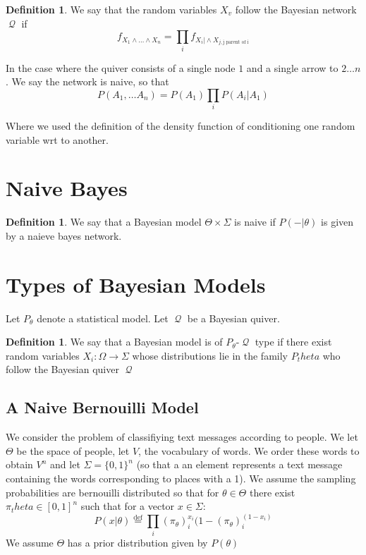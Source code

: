 \documentclass{book}
\theoremstyle{plain}
\theoremstyle{definition}
\newtheorem{definition}[corollary]{Definition}
\newcommand{\define}{\stackrel{\operatorname{def}}{=}}
\newcommand{\mor}{\longrightarrow}
\DeclareMathOperator{\Qvr}{\mathcal{Q}}
\begin{document}
\begin{definition}
We say that the random variables $X_v$ follow the Bayesian network $\Qvr$ if
\[
f_{X_1\wedge \ldots \wedge X_n}=\prod_i f_{X_i \vert \wedge X_{j, \textrm{j parent of i}}}\]
\end{definition}
In the case where the quiver consists of a single node $1$ and a single arrow to $2\ldots n$. We say the network is naive, so that
\[
P(A_1,\ldots A_n)=P(A_1)\prod_i P(A_i\vert A_1)
\]

Where we used the definition of the density function of conditioning one random variable wrt to another.
\section{Naive Bayes}

\begin{definition}
We say that a Bayesian model $\Theta \times \Sigma$ 	is naive if $P(-\vert \theta)$ is given by a naieve bayes network.
\end{definition}



\section{Types of Bayesian Models}

Let $P_\theta$ denote a statistical model. Let $\Qvr$ be a Bayesian quiver.

\begin{definition}
We say that a Bayesian model is of $P_\theta$-$\Qvr$ type if there exist random variables $X_i:\Omega	\mor \Sigma$ whose distributions lie in the family $P_theta$ who follow the Bayesian quiver $\Qvr$
\end{definition}



\subsection{A Naive Bernouilli Model}

We consider the problem of classifiying text messages according to people. We let $\Theta$ be the space of people, let $V$, the vocabulary of words. We order these words to obtain $V^n$ and  let $\Sigma=\{0,1\}^n$ (so that a an element represents a text message containing the words corresponding to places with a 1). We assume the sampling probabilities are bernouilli distributed so that for $\theta \in \Theta$ there exist $\pi_theta \in [0,1]^n$ such that for a vector $x \in \Sigma$:
\[
P(x\vert \theta)\define \prod_i (\pi_\theta)_i^{x_i} (1-(\pi_\theta)_i^{(1-x_i)}
\]
We assume $\Theta$ has a prior distribution given by $P(\theta)$
\end{document}
